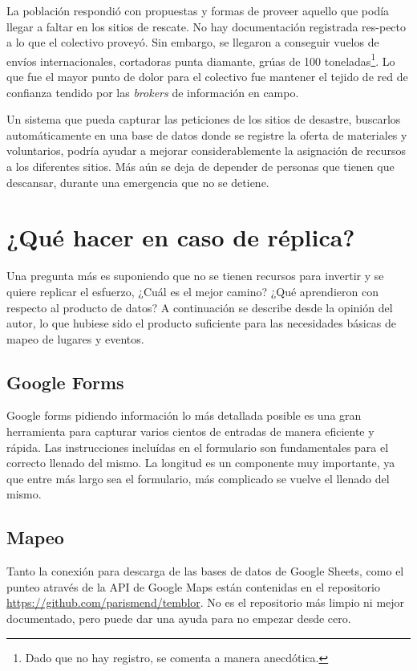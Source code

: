 \documentclass[12pt,spanish,oneside,breaklinks]{book}
\begin{document}
La población respondió con propuestas y formas de proveer aquello que podía llegar a faltar en los sitios de rescate. No hay documentación registrada res-pecto a lo que el colectivo proveyó. Sin embargo, se llegaron a conseguir vuelos de envíos internacionales, cortadoras punta diamante, grúas de 100 toneladas\footnote{Dado que no hay registro, se comenta a manera anecdótica.}. Lo que fue el mayor punto de dolor para el colectivo fue mantener el tejido de red de confianza tendido por las \emph{brokers} de información en campo.

Un sistema que pueda capturar las peticiones de los sitios de desastre, buscarlos automáticamente en una base de datos donde se registre la oferta de materiales y voluntarios, podría ayudar a mejorar considerablemente la asignación de recursos a los diferentes sitios. Más aún se deja de depender de personas que tienen que descansar, durante una emergencia que no se detiene.

\newpage
\section{¿Qué hacer en caso de réplica?}
\label{sec:orgf71479c}
Una pregunta más es suponiendo que no se tienen recursos para invertir y se quiere replicar el esfuerzo, ¿Cuál es el mejor camino? ¿Qué aprendieron con respecto al producto de datos? A continuación se describe desde la opinión del autor, lo que hubiese sido el producto suficiente para las necesidades básicas de mapeo de lugares y eventos.

\subsection{Google Forms}
\label{sec:org18d6845}
Google forms pidiendo información lo más detallada posible es una gran herramienta para capturar varios cientos de entradas de manera eficiente y rápida. Las instrucciones incluídas en el formulario son fundamentales para el correcto llenado del mismo. La longitud es un componente muy importante, ya que entre más largo sea el formulario, más complicado se vuelve el llenado del mismo.
\subsection{Mapeo}
\label{sec:org50e16f7}
Tanto la conexión para descarga de las bases de datos de Google Sheets, como el punteo através de la API de Google Maps están contenidas en el repositorio \url{https://github.com/parismend/temblor}. No es el repositorio más limpio ni mejor documentado, pero puede dar una ayuda para no empezar desde cero.
\end{document}
